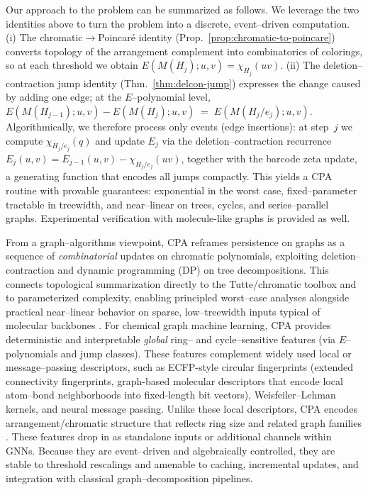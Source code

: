 \documentclass[runningheads]{llncs}
\begin{document}
Our approach to the problem can be summarized as follows. 
We leverage the two identities above to turn the problem into a discrete,
event–driven computation. (i) The chromatic$\to$Poincaré identity
(Prop.~\ref{prop:chromatic-to-poincare}) converts topology of the arrangement
complement into combinatorics of colorings, so at each threshold we obtain
$E(M(H_j);u,v)=\chi_{H_j}(uv)$. 
(ii) The deletion–contraction jump identity
(Thm.~\ref{thm:delcon-jump}) expresses the change caused by adding one
edge; at the $E$–polynomial level,
$E(M(H_{j-1});u,v)-E(M(H_j);u,v) \;=\; E(M(H_j/e_j);u,v).$
Algorithmically, we therefore process only events (edge insertions): 
at step~$j$ we compute $\chi_{H_j/e_j}(q)$ and update $E_j$ via 
the deletion--contraction recurrence 
$E_j(u,v)=E_{j-1}(u,v)-\chi_{H_j/e_j}(uv)$, 
together with the barcode zeta update, a generating function that encodes all jumps 
compactly. This yields a CPA routine with provable guarantees: exponential in 
the worst case, fixed–parameter tractable in treewidth, and near–linear on trees, cycles, 
and series–parallel graphs. Experimental verification with molecule-like graphs 
is provided as well.

From a graph–algorithms viewpoint, CPA reframes persistence on graphs as a 
sequence of \emph{combinatorial} updates on chromatic polynomials, exploiting 
deletion–contraction and dynamic programming (DP) on tree decompositions. This 
connects topological summarization directly to the Tutte/chromatic toolbox and 
to parameterized complexity, enabling principled worst–case analyses alongside 
practical near–linear behavior on sparse, low–treewidth inputs typical of 
molecular backbones \cite{JaegerVertiganWelsh1990,Noble1998,Bodlaender1996}. 
For chemical graph machine learning, CPA provides deterministic and 
interpretable \emph{global} ring– and cycle–sensitive features 
(via $E$–polynomials and jump classes). 
These features complement widely used local or message–passing descriptors, 
such as ECFP-style circular fingerprints (extended connectivity fingerprints, 
graph-based molecular descriptors that encode local atom–bond neighborhoods 
into fixed-length bit vectors), Weisfeiler–Lehman kernels, and neural message 
passing. Unlike these local descriptors, CPA encodes arrangement/chromatic 
structure that reflects ring size and related graph families 
\cite{Shervashidze2011,Gilmer2017,Duvenaud2015,Xu2019,Morris2019}.
These features drop in as standalone inputs or additional channels within GNNs. 
Because they are event–driven and algebraically controlled, they are stable to 
threshold rescalings and amenable to caching, incremental updates, and integration 
with classical graph–decomposition pipelines.
\end{document}
